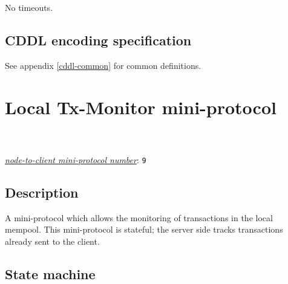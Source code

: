 No timeouts.

\subsection{CDDL encoding specification}

See appendix \ref{cddl-common} for common definitions.

\section{Local Tx-Monitor mini-protocol}
\\
\\
\hyperref[table:node-to-client-protocol-numbers]{\textit{node-to-client mini-protocol number}}: \texttt{9}\\
\label{local-tx-monitor-protocol}
\newcommand{\MsgAwaitAcquire}{\msg{MsgAwaitAcquire}}

\newcommand{\NextTx}{\state{NextTx}}
\newcommand{\MsgNextTx}{\msg{MsgNextTx}}
\newcommand{\MsgReplyNextTx}{\msg{MsgReplyNextTx}}

\newcommand{\MsgHasTx}{\msg{MsgHasTx}}
\newcommand{\HasTx}{\state{HasTx}}
\newcommand{\MsgReplyHasTx}{\msg{MsgReplyHasTx}}

\newcommand{\GetSizes}{\state{GetSizes}}
\newcommand{\MsgGetSizes}{\msg{MsgGetSizes}}
\newcommand{\MsgReplyGetSizes}{\msg{MsgReplyGetSizes}}

\newcommand{\GetMeasures}{\state{GetMeasures}}
\newcommand{\MsgGetMeasures}{\msg{MsgGetMeasures}}
\newcommand{\MsgReplyGetMeasures}{\msg{MsgReplyGetMeasures}}

\subsection{Description}

A mini-protocol which allows the monitoring of transactions in the local mempool. This
mini-protocol is stateful; the server side tracks transactions already sent to
the client.

\subsection{State machine}

